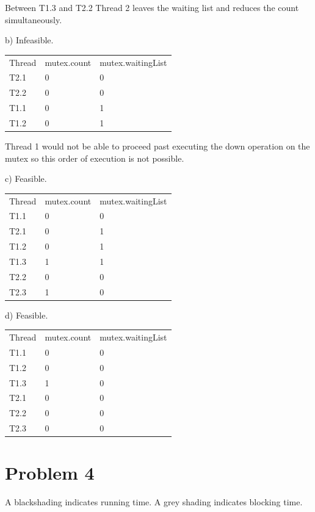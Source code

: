 \documentclass[11pt]{article} %
\begin{document}
Between T1.3 and T2.2 Thread 2 leaves the waiting list and reduces the count simultaneously.
\bigskip
\bigskip
\bigskip
\bigskip\bigskip\bigskip\bigskip\bigskip\bigskip

\noindent b) Infeasible.
\bigskip

\begin{tabular}{ l l l }
  Thread & mutex.count & mutex.waitingList \\
  T2.1 & 0 & 0 \\
  T2.2 & 0 & 0 \\
  T1.1 & 0 & 1 \\
  T1.2 & 0 & 1 \\
\end{tabular}
\bigskip

Thread 1 would not be able to proceed past executing the down operation on the mutex so this order of execution is not possible.
\bigskip

\noindent c) Feasible.
\bigskip

\begin{tabular}{ l l l }
  Thread & mutex.count & mutex.waitingList \\
  T1.1 & 0 & 0 \\
  T2.1 & 0 & 1 \\
  T1.2 & 0 & 1 \\
  T1.3 & 1 & 1 \\
  T2.2 & 0 & 0 \\
  T2.3 & 1 & 0 \\
\end{tabular}
\bigskip

\noindent d) Feasible.
\bigskip

\begin{tabular}{ l l l }
  Thread & mutex.count & mutex.waitingList \\
  T1.1 & 0 & 0 \\
  T1.2 & 0 & 0 \\
  T1.3 & 1 & 0 \\
  T2.1 & 0 & 0 \\
  T2.2 & 0 & 0 \\
  T2.3 & 0 & 0 \\
\end{tabular}
\bigskip


\section*{Problem 4}
A blackshading indicates running time. A grey shading indicates blocking time.
\end{document}
